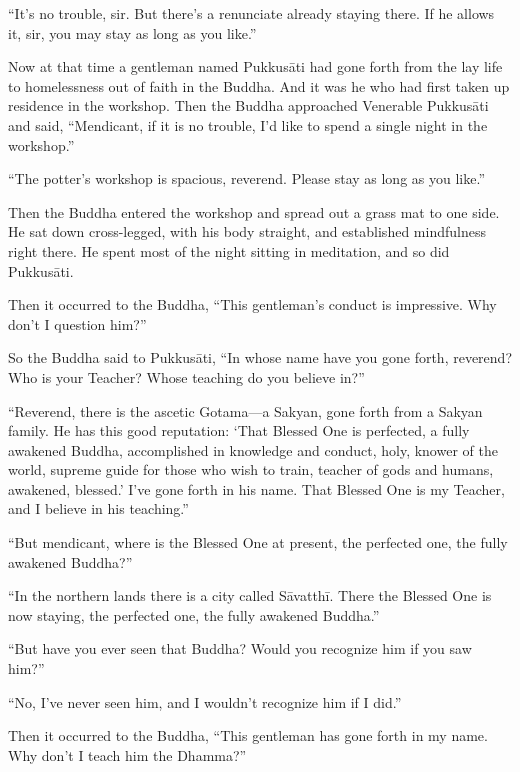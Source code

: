 \documentclass[12pt,openany]{book}%
\begin{document}
“It’s no trouble, sir. But there’s a renunciate already staying there. If he allows it, sir, you may stay as long as you like.” 

Now at that time a gentleman named \textsanskrit{Pukkusāti} had gone forth from the lay life to homelessness out of faith in the Buddha. And it was he who had first taken up residence in the workshop. Then the Buddha approached Venerable \textsanskrit{Pukkusāti} and said, “Mendicant, if it is no trouble, I’d like to spend a single night in the workshop.” 

“The potter’s workshop is spacious, reverend. Please stay as long as you like.” 

Then the Buddha entered the workshop and spread out a grass mat to one side. He sat down cross-legged, with his body straight, and established mindfulness right there. He spent most of the night sitting in meditation, and so did \textsanskrit{Pukkusāti}. 

Then it occurred to the Buddha, “This gentleman’s conduct is impressive. Why don’t I question him?” 

So the Buddha said to \textsanskrit{Pukkusāti}, “In whose name have you gone forth, reverend? Who is your Teacher? Whose teaching do you believe in?” 

“Reverend, there is the ascetic Gotama—a Sakyan, gone forth from a Sakyan family. He has this good reputation: ‘That Blessed One is perfected, a fully awakened Buddha, accomplished in knowledge and conduct, holy, knower of the world, supreme guide for those who wish to train, teacher of gods and humans, awakened, blessed.’ I’ve gone forth in his name. That Blessed One is my Teacher, and I believe in his teaching.” 

“But mendicant, where is the Blessed One at present, the perfected one, the fully awakened Buddha?” 

“In the northern lands there is a city called \textsanskrit{Sāvatthī}. There the Blessed One is now staying, the perfected one, the fully awakened Buddha.” 

“But have you ever seen that Buddha? Would you recognize him if you saw him?” 

“No, I’ve never seen him, and I wouldn’t recognize him if I did.” 

Then it occurred to the Buddha, “This gentleman has gone forth in my name. Why don’t I teach him the Dhamma?” 
\end{document}
